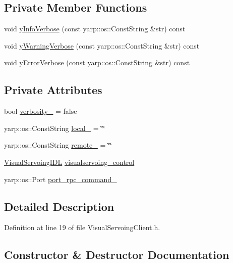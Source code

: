 \subsection*{Private Member Functions}
\begin{DoxyCompactItemize}
\item 
void \hyperlink{classVisualServoingClient_a1a6aee4324f230185356960adc22ecfc}{y\+Info\+Verbose} (const yarp\+::os\+::\+Const\+String \&str) const
\item 
void \hyperlink{classVisualServoingClient_ab9c5c456032851ef0bec5b97980a97f8}{y\+Warning\+Verbose} (const yarp\+::os\+::\+Const\+String \&str) const
\item 
void \hyperlink{classVisualServoingClient_a0977c43fb682f6eefa6ad90850a98ff4}{y\+Error\+Verbose} (const yarp\+::os\+::\+Const\+String \&str) const
\end{DoxyCompactItemize}
\subsection*{Private Attributes}
\begin{DoxyCompactItemize}
\item 
bool \hyperlink{classVisualServoingClient_a8c18353c2a7f838ce75b5a426b5b4c21}{verbosity\+\_\+} = false
\item 
yarp\+::os\+::\+Const\+String \hyperlink{classVisualServoingClient_a0b485c388dfe357bd5b504bc87449ff5}{local\+\_\+} = \char`\"{}\char`\"{}
\item 
yarp\+::os\+::\+Const\+String \hyperlink{classVisualServoingClient_ad2d718343d5fec7dd28c2eff9fd5d481}{remote\+\_\+} = \char`\"{}\char`\"{}
\item 
\hyperlink{classVisualServoingIDL}{Visual\+Servoing\+I\+DL} \hyperlink{classVisualServoingClient_a13c52256db8c843064c7c7ad4fc38e13}{visualservoing\+\_\+control}
\item 
yarp\+::os\+::\+Port \hyperlink{classVisualServoingClient_ae1f44cd6e0759f1d32d581f9d9ea8137}{port\+\_\+rpc\+\_\+command\+\_\+}
\end{DoxyCompactItemize}


\subsection{Detailed Description}


Definition at line 19 of file Visual\+Servoing\+Client.\+h.



\subsection{Constructor \& Destructor Documentation}
\mbox{\label{classVisualServoingClient_a8656f6464b80d6a5815232c90bb0f9f7}} 
